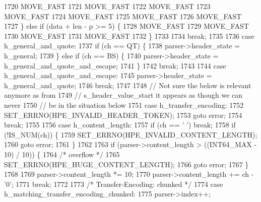 \begin{DoxyCode}
1720               MOVE_FAST
1721               MOVE_FAST
1722               MOVE_FAST
1723               MOVE_FAST
1724               MOVE_FAST
1725               MOVE_FAST
1726               MOVE_FAST
1727             \} \textcolor{keywordflow}{else} \textcolor{keywordflow}{if} (data + len - p >= 5) \{
1728               MOVE_FAST
1729               MOVE_FAST
1730               MOVE_FAST
1731               MOVE_FAST
1732             \}
1733 
1734             \textcolor{keywordflow}{break};
1735 
1736           \textcolor{keywordflow}{case} h_general_and_quote:
1737             \textcolor{keywordflow}{if} (ch == QT) \{
1738               parser->header_state = h_general;
1739             \} \textcolor{keywordflow}{else} \textcolor{keywordflow}{if} (ch == BS) \{
1740               parser->header_state = h_general_and_quote_and_escape;
1741             \}
1742             \textcolor{keywordflow}{break};
1743 
1744           \textcolor{keywordflow}{case} h_general_and_quote_and_escape:
1745             parser->header_state = h_general_and_quote;
1746             \textcolor{keywordflow}{break};
1747 
1748           \textcolor{comment}{// Not sure the below is relevant anymore as from}
1749           \textcolor{comment}{// s\_header\_value\_start it appears as though we can never}
1750           \textcolor{comment}{// be in the situation below}
1751           \textcolor{keywordflow}{case} h_transfer_encoding:
1752             SET_ERRNO(HPE_INVALID_HEADER_TOKEN);
1753             \textcolor{keywordflow}{goto} error;
1754             \textcolor{keywordflow}{break};
1755 
1756           \textcolor{keywordflow}{case} h_content_length:
1757             \textcolor{keywordflow}{if} (ch == \textcolor{charliteral}{' '}) \textcolor{keywordflow}{break};
1758             \textcolor{keywordflow}{if} (!IS_NUM(ch)) \{
1759               SET_ERRNO(HPE_INVALID_CONTENT_LENGTH);
1760               \textcolor{keywordflow}{goto} error;
1761             \}
1762 
1763             \textcolor{keywordflow}{if} (parser->content_length > ((INT64\_MAX - 10) / 10)) \{
1764               \textcolor{comment}{/* overflow */}
1765               SET_ERRNO(HPE_HUGE_CONTENT_LENGTH);
1766               \textcolor{keywordflow}{goto} error;
1767             \}
1768 
1769             parser->content_length *= 10;
1770             parser->content_length += ch - \textcolor{charliteral}{'0'};
1771             \textcolor{keywordflow}{break};
1772 
1773           \textcolor{comment}{/* Transfer-Encoding: chunked */}
1774           \textcolor{keywordflow}{case} h_matching_transfer_encoding_chunked:
1775             parser->index++;

\end{DoxyCode}
